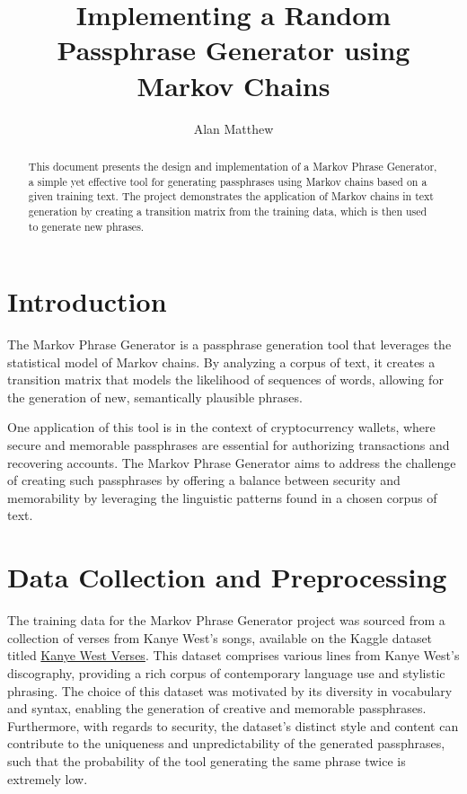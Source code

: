 \documentclass[a4paper,12pt]{article}
\begin{document}
\title{Implementing a Random Passphrase Generator using Markov Chains}
\author{Alan Matthew}
\date{}
\maketitle

\begin{abstract}
This document presents the design and implementation of a Markov Phrase Generator, a simple yet effective tool for generating passphrases using Markov chains based on a given training text. The project demonstrates the application of Markov chains in text generation by creating a transition matrix from the training data, which is then used to generate new phrases.
\end{abstract}

\pagestyle{fancy}
\fancyhead{}
\fancyfoot{}
\fancyfoot[C]{\thepage}

\newpage
\tableofcontents
\newpage

\section{Introduction}
The Markov Phrase Generator is a passphrase generation tool that leverages the statistical model of Markov chains. By analyzing a corpus of text, it creates a transition matrix that models the likelihood of sequences of words, allowing for the generation of new, semantically plausible phrases.

One application of this tool is in the context of cryptocurrency wallets, where secure and memorable passphrases are essential for authorizing transactions and recovering accounts. The Markov Phrase Generator aims to address the challenge of creating such passphrases by offering a balance between security and memorability by leveraging the linguistic patterns found in a chosen corpus of text.

\section{Data Collection and Preprocessing}
The training data for the Markov Phrase Generator project was sourced from a collection of verses from Kanye West's songs, available on the Kaggle dataset titled \href{https://www.kaggle.com/viccalexander/kanyewestverses}{Kanye West Verses}.
This dataset comprises various lines from Kanye West's discography, providing a rich corpus of contemporary language use and stylistic phrasing. The choice of this dataset was motivated by its diversity in vocabulary and syntax, enabling the generation of creative and memorable passphrases.
Furthermore, with regards to security, the dataset's distinct style and content can contribute to the uniqueness and unpredictability of the generated passphrases, such that the probability of the tool generating the same phrase twice is extremely low.
\end{document}
